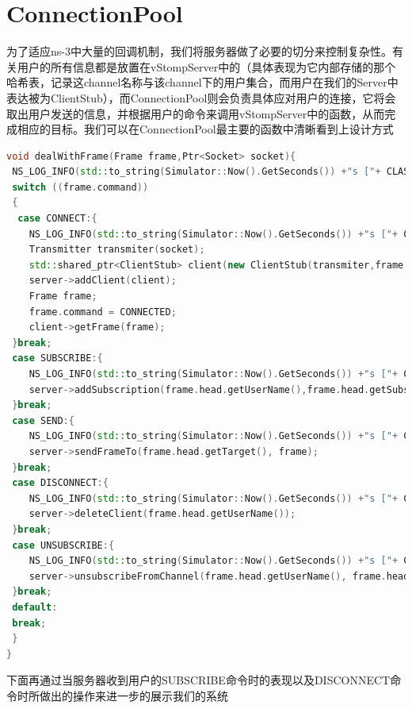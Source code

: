 \documentclass{ctexrep}
\begin{document}
	\section{ConnectionPool}
	为了适应ns-3中大量的回调机制，我们将服务器做了必要的切分来控制复杂性。有关用户的所有信息都是放置在vStompServer中的（具体表现为它内部存储的那个哈希表，记录这channel名称与该channel下的用户集合，而用户在我们的Server中表达被为ClientStub），而ConnectionPool则会负责具体应对用户的连接，它将会取出用户发送的信息，并根据用户的命令来调用vStompServer中的函数，从而完成相应的目标。我们可以在ConnectionPool最主要的函数中清晰看到上设计方式\begin{lstlisting}[language=c++]
void dealWithFrame(Frame frame,Ptr<Socket> socket){
 NS_LOG_INFO(std::to_string(Simulator::Now().GetSeconds()) +"s ["+ CLASSNAME +"]:     " + "Parse the frame");
 switch ((frame.command))
 {
  case CONNECT:{
	NS_LOG_INFO(std::to_string(Simulator::Now().GetSeconds()) +"s ["+ CLASSNAME +"]:     " + "This is a connect message");
	Transmitter transmiter(socket);
	std::shared_ptr<ClientStub> client(new ClientStub(transmiter,frame.head.getUserName()));
	server->addClient(client);
	Frame frame;
	frame.command = CONNECTED;
	client->getFrame(frame);
 }break;
 case SUBSCRIBE:{
	NS_LOG_INFO(std::to_string(Simulator::Now().GetSeconds()) +"s ["+ CLASSNAME +"]:     " + "This is a subscribe message");
	server->addSubscription(frame.head.getUserName(),frame.head.getSubscribe());
 }break;
 case SEND:{
	NS_LOG_INFO(std::to_string(Simulator::Now().GetSeconds()) +"s ["+ CLASSNAME +"]:     " + "This is a send message");
	server->sendFrameTo(frame.head.getTarget(), frame);
 }break;
 case DISCONNECT:{
	NS_LOG_INFO(std::to_string(Simulator::Now().GetSeconds()) +"s ["+ CLASSNAME +"]:     " + "This is a disconnect message");
	server->deleteClient(frame.head.getUserName());
 }break;
 case UNSUBSCRIBE:{
	NS_LOG_INFO(std::to_string(Simulator::Now().GetSeconds()) +"s ["+ CLASSNAME +"]:     " + "This is a unsubscribe message");
	server->unsubscribeFromChannel(frame.head.getUserName(), frame.head.getSubscribe());
 }break;
 default:
 break;
 }
}
	\end{lstlisting}
	下面再通过当服务器收到用户的SUBSCRIBE命令时的表现以及DISCONNECT命令时所做出的操作来进一步的展示我们的系统
\end{document}
